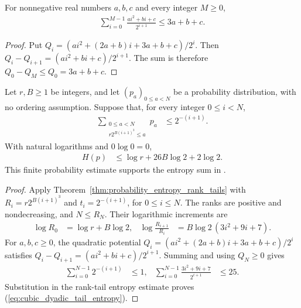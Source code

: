 \begin{lemma}
    \label{lem:quadratic_dyadic_moment}
    \leanok
    For nonnegative real numbers $a,b,c$ and every integer $M\ge0$,
    \begin{align*}
        \sum_{i=0}^{M-1}\frac{ai^2+bi+c}{2^{i+1}}\le3a+b+c.
    \end{align*}
\end{lemma}
\begin{proof}\leanok
    Put $Q_i=(ai^2+(2a+b)i+3a+b+c)/2^i$. Then
    $Q_i-Q_{i+1}=(ai^2+bi+c)/2^{i+1}$. The sum is therefore
    $Q_0-Q_M\le Q_0=3a+b+c$.
\end{proof}

\begin{theorem}
    \label{thm:probability_entropy_cubic_dyadic_tails}
    \leanok
    Let $r,B\ge1$ be integers, and let $(p_a)_{0\le a<N}$ be a probability
    distribution, with no ordering assumption. Suppose that, for every integer
    $0\le i<N$,
    \begin{align}
        \sum_{\substack{0\le a<N\\r2^{B(i+1)^3}\le a}}p_a
        &\le2^{-(i+1)}.
        \label{eq:cubic_dyadic_tail_input}
    \end{align}
    With natural logarithms and $0\log0=0$,
    \begin{align}
        H(p)&\le\log r+26B\log2+2\log2.
        \label{eq:cubic_dyadic_tail_entropy}
    \end{align}
    This finite probability estimate supports the entropy sum in
    \cite[proof of Theorem~4.9]{Arad2016RigorousRG}.
\end{theorem}
\begin{proof}
    \leanok
    Apply Theorem~\ref{thm:probability_entropy_rank_tails} with
    $R_i=r2^{B(i+1)^3}$ and $t_i=2^{-(i+1)}$, for $0\le i\le N$.
    The ranks are positive and nondecreasing, and $N\le R_N$.
    Their logarithmic increments are
    \begin{align*}
        \log R_0&=\log r+B\log2, &
        \log\frac{R_{i+1}}{R_i}&=B\log2\,(3i^2+9i+7).
    \end{align*}
    For $a,b,c\ge0$, the quadratic potential
    $Q_i=(ai^2+(2a+b)i+3a+b+c)/2^i$ satisfies
    $Q_i-Q_{i+1}=(ai^2+bi+c)/2^{i+1}$.
    Summing and using $Q_N\ge0$ gives
    \begin{align*}
        \sum_{i=0}^{N-1}2^{-(i+1)}&\le1, &
        \sum_{i=0}^{N-1}\frac{3i^2+9i+7}{2^{i+1}}&\le25.
    \end{align*}
    Substitution in the rank-tail entropy estimate proves
    (\ref{eq:cubic_dyadic_tail_entropy}).
\end{proof}


